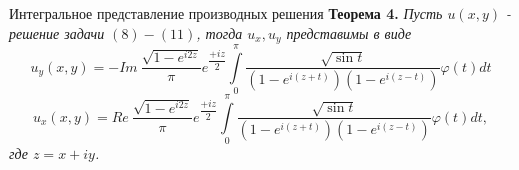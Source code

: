 \documentclass[10pt,pdf,hyperref={unicode}]{beamer}
\begin{document}
\begin{frame} {Интегральное представление производных решения}
	\textbf{Теорема 4.} \textit{	Пусть $u(x,y)$ - решение задачи $(8)-(11)$, тогда $u_x, u_y$ представимы в виде
		\begin{equation}
			u_y(x,y) = - Im\  \dfrac{ \sqrt{1 - e^{i2z}} }{\pi} e^{\dfrac{+iz}{2}} \int\limits_0^\pi  \dfrac{\sqrt{\sin{t}}}{\left(1 - e^{i(z+t)} \right) \left(1 - e^{i(z-t)}\right)}  \varphi(t) dt
		\end{equation}
		\begin{equation}
			u_x(x,y) = Re\   \dfrac{ \sqrt{1 - e^{i2z}} }{\pi} e^{\dfrac{+iz}{2}} \int\limits_0^\pi  \dfrac{\sqrt{\sin{t}}}{\left(1 - e^{i(z+t)} \right) \left(1 - e^{i(z-t)}\right)}  \varphi(t) dt,
	\end{equation}
	где $z = x + iy$.
}
	
\end{frame}
\end{document}
